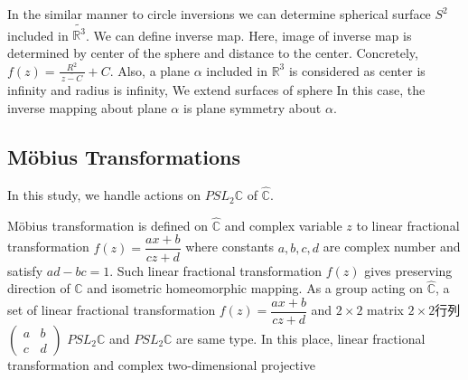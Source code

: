 In the similar manner to circle inversions we can determine spherical
surface $S^2$ included in $\tilde{\mathbb{R}^3}$.
We can define inverse map.
Here, image of inverse map is determined by center of the sphere and
distance to the center. Concretely, $f(z) = \frac{R^2}{~\overline{z -C}~} + C$. 
Also, a plane $\alpha$ included in $\mathbb{R}^3$ is considered as
center is infinity and radius is infinity,
We extend surfaces of sphere
In this case, the inverse mapping about plane $\alpha$ is plane symmetry
about $\alpha$.




\subsection{M\"obius Transformations}

In this study, we handle actions on $PSL_2\mathbb{C}$ of $\hat{\mathbb{C}}$.

M\"obius transformation is defined on $\hat{\mathbb{C}}$ and 
complex variable $z$ to linear fractional transformation 
$f(z)=\dfrac{ax+b}{cz+d}$ where constants $a, b, c, d$ are complex
number and satisfy $ad - bc = 1$.
Such linear fractional transformation $f(z)$ gives preserving direction of
$\hat{\mathbb{C}}$ and isometric homeomorphic mapping.
As a group acting on $\hat{\mathbb{C}}$, a set of linear fractional
transformation $f(z) = \dfrac{ax + b}{cz + d}$ and $2 \times 2$ matrix
$2\times 2$行列$\begin{pmatrix}a & b \\ c& d \end{pmatrix}$
$PSL_2\mathbb{C}$ and $PSL_2\mathbb{C}$ are same type. 
In this place, linear fractional transformation and
complex two-dimensional
projective

